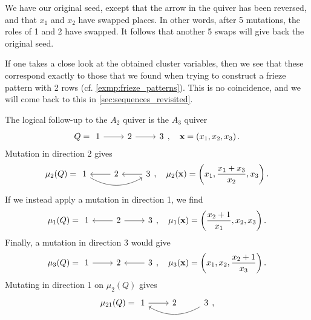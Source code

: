 \begin{example}
	We have our original seed, except that the arrow in the quiver has been reversed, and
	that $x_1$ and $x_2$ have swapped places. In other words, after 5 mutations, the roles
	of 1 and 2 have swapped. It follows that another 5 swaps will give back the original
	seed.

	If one takes a close look at the obtained cluster variables, then we see that these
	correspond exactly to those that we found when trying to construct a frieze pattern
	with 2 rows (cf. \cref{exmp:frieze_patterns}). This is no coincidence, and we will come
	back to this in \cref{sec:sequences_revisited}.
\end{example}

\begin{example}
	The logical follow-up to the $A_2$ quiver is the $A_3$ quiver
	\begin{equation*}
		Q =
		\begin{tikzcd}
			1 \rar[] & 2 \rar[] &3
		\end{tikzcd},
		\quad \bx = \left(x_1, x_2, x_3\right).
	\end{equation*}
	Mutation in direction 2 gives
	\begin{equation*}
		\mu_2(Q) =
		\begin{tikzcd}
			1 \rar[leftarrow] \ar[rr, bend right] & 2 \rar[leftarrow]& 3
		\end{tikzcd},
		\quad \mu_2(\bx) = \left(x_1, \frac{x_1 + x_3}{x_2}, x_3\right).
	\end{equation*}
	If we instead apply a mutation in direction 1, we find
	\begin{equation*}
		\mu_1(Q) =
		\begin{tikzcd}
			1 \rar[leftarrow] & 2 \rar[]& 3
		\end{tikzcd},
		\quad \mu_1(\bx) = \left(\frac{x_2 + 1}{x_1}, x_2, x_3\right).
	\end{equation*}
	Finally, a mutation in direction 3 would give
	\begin{equation*}
		\mu_3(Q) =
		\begin{tikzcd}
			1 \rar[] & 2 \rar[leftarrow]& 3
		\end{tikzcd},
		\quad \mu_3(\bx) = \left(x_1, x_2, \frac{x_2 + 1}{x_3}\right).
	\end{equation*}
	Mutating in direction 1 on $\mu_2(Q)$ gives
	\begin{equation*}
		\mu_{21}(Q) =
		\begin{tikzcd}
			1 \rar[] \ar[rr,leftarrow, bend right] & 2 & 3
		\end{tikzcd},

\end{equation*}
\end{example}
